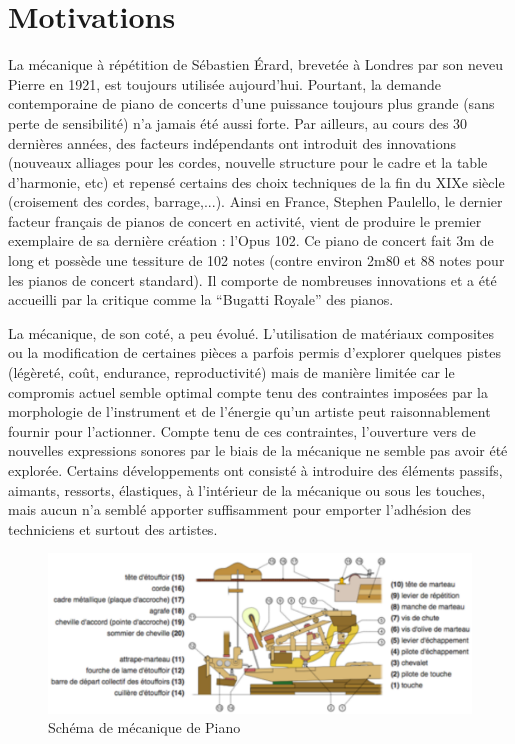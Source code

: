 \documentclass[french,a4paper,12pt]{report}
\begin{document}
 \section{Motivations}
 
 La mécanique à répétition de Sébastien Érard, brevetée à Londres par son neveu Pierre en 1921, est toujours utilisée aujourd’hui. Pourtant, la demande contemporaine de piano de concerts d’une puissance toujours plus grande (sans perte de sensibilité) n’a jamais été aussi forte. Par ailleurs, au cours des 30 dernières années, des facteurs indépendants ont introduit des innovations (nouveaux alliages pour les cordes, nouvelle structure pour le cadre et la table d’harmonie, etc) et repensé certains des choix techniques de la fin du XIXe siècle (croisement des cordes, barrage,...). Ainsi en France, Stephen Paulello, le dernier facteur français de pianos de concert en activité, vient de produire le premier exemplaire de sa dernière création : l’Opus 102. Ce piano de concert fait 3m de long et possède une tessiture de 102 notes (contre environ 2m80 et 88 notes pour les pianos de concert standard). Il comporte de nombreuses innovations et a été accueilli par la critique comme la “Bugatti Royale” des pianos.

La mécanique, de son coté, a peu évolué. L’utilisation de matériaux composites ou la modification de certaines pièces a parfois permis d’explorer quelques pistes (légèreté, coût, endurance, reproductivité) mais de manière limitée car le compromis actuel semble optimal compte tenu des contraintes imposées par la morphologie de l’instrument et de l’énergie qu’un artiste peut raisonnablement fournir pour l’actionner. Compte tenu de ces contraintes, l’ouverture vers de nouvelles expressions sonores par le biais de la mécanique ne semble pas
avoir été explorée. Certains développements ont consisté à introduire des éléments passifs, aimants, ressorts, élastiques, à l’intérieur de la mécanique ou sous les touches, mais aucun n’a semblé apporter suffisamment pour emporter l’adhésion des techniciens et surtout des artistes.\newline

	\begin{figure}[!ht]
    \center
    \includegraphics[width=15cm]{MECA_PIANO.png}
    \caption{Schéma de mécanique de Piano}
	\end{figure} 
\end{document}
